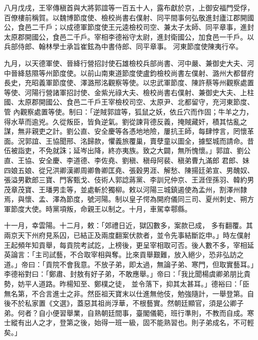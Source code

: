 \begin{pinyinscope}
 八月戊戌，王宰傳稹首與大將郭誼等一百五十人，露布獻於京，上御安福門受俘，百僚樓前稱賀。以魏博節度使、檢校尚書右僕射、同平間事何弘敬進封廬江郡開國公，食邑二千戶；以成德軍節度使王元逵檢校司空、兼太子太師、同平章事，進封太原郡開國公，食邑二千戶。宰相李德裕守太尉，進封衛國公，加食邑一千戶。以兵部侍郎、翰林學士承旨崔鉉為中書侍郎、同平章事。
 河東節度使陳夷行卒。



 九月，以天德軍使、晉絳行營招討使石雄檢校兵部尚書、河中嚴、兼御史大夫、河中晉絳慈隰等州節度使。以前山南東道節度使盧鈞檢校尚書左僕射、潞州大都督府長史，充昭義軍節度使、澤潞邢洺觀察等使。以忠武軍節度、陳許蔡等州觀察處置等使、河陽行營諸軍招討使、金紫光祿大夫、檢校尚書右僕射、兼御史大夫、上柱國、太原郡開國公、食邑二千戶王宰檢校司空、太原尹、北都留守，充河東節度、管
 內觀察處置等使。制曰：「逆賊郭誼等，狐鼠之妖，依丘穴而作固；牛羊之力，得水草而逾兇。久從叛臣，皆負逆氣。劉從諫背德反義，掩賊藏奸，積其怙亂之謀，無非親吏之計。劉公直、安全慶等各憑地地險，屢抗王師，每肆悖言，罔懷革面。況郭誼、王協聞邢、洺歸款，懼義旅覆巢，賣孽童以圖全，據堅城而請命。昔伍被詣吏，不免就誅；延岑出降，終亦夷族。致之大闢，無所愧懷。」郭誼、劉公直、王協、安全慶、李道德、李佐堯、劉稹、稹母阿裴、稹弟曹九滿郎
 君郎、妹四娘五娘、從兄洪卿漢卿周卿魯卿匡堯、張穀男涯、解愁、陳揚廷弟宣、男醜奴、張溢男歡郎三寶、門客甄戈、伎術人郭諗蔣黨、李訓兄仲京、王涯侄孫羽、韓約男茂章茂寶、王璠男圭等，並處斬於獨柳。敕以河陽三城鎮遏使為孟州，割澤州隸焉，與懷、孟、澤為節度，號河陽。制以皇子愕為開府儀同三司、夏州刺史、朔方軍節度大使。時黨項叛，命親王以制之。十月，車駕幸鄠縣。



 十一月，幸雲陽。十二月，敕：「郊禮日近，獄囚數多，案款已成，
 多有翻覆。其兩京天下州府見系囚，已結正及兩度翻案伏款者，並令先事結斷訖申。」時左僕射王起頻年知貢舉，每貢院考試訖，上榜後，更呈宰相取可否。後人數不多，宰相延英論言：「主司試藝，不合取宰相與奪。比來貢舉艱難，放入絕少，恐非弘訪之道。」帝曰：「貢院不會我意。不放子弟，即太過，無論子弟、寒門，但取實藝耳。」李德裕對曰：「鄭肅、封敖有好子弟，不敢應舉。」帝曰：「我比聞楊虞卿弟朋比貴勢，妨平人道路。昨楊知至、鄭樸之徒，
 並令落下，抑其太甚耳。」德裕曰：「臣無名第，不合言進士之非。然臣祖天寶末以仕進無他伎，勉強隨計，一舉登第。自後不於私家置《文選》，蓋惡其祖尚浮華，不根藝實。然朝廷顯官，須是公卿子弟。何者？自小便習舉業，自熟朝廷間事，臺閣儀範，班行準則，不教而自成。寒士縱有出人之才，登第之後，始得一班一級，固不能熟習也。則子弟成名，不可輕矣。」




\end{pinyinscope}
